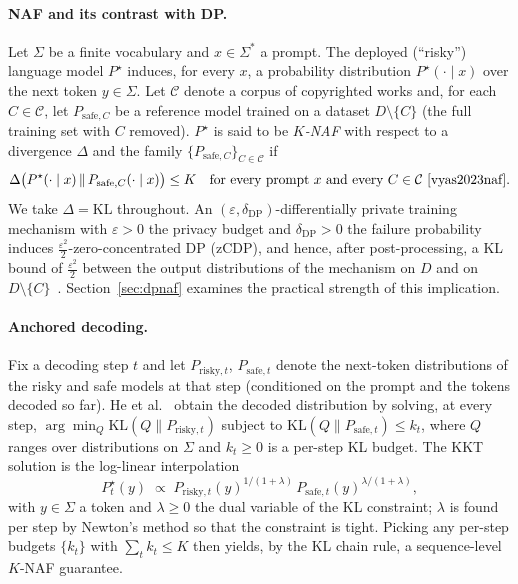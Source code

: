 \documentclass{article}
\begin{document}
\paragraph{NAF and its contrast with DP.}
Let $\Sigma$ be a finite vocabulary and $x\in\Sigma^*$ a prompt.  The deployed (``risky'') language model $P^\star$ induces, for every $x$, a probability distribution $P^\star(\cdot\mid x)$ over the next token $y\in\Sigma$.  Let $\mathcal C$ denote a corpus of copyrighted works and, for each $C\in\mathcal C$, let $P_{\mathrm{safe},C}$ be a reference model trained on a dataset $D\setminus\{C\}$ (the full training set with $C$ removed).  $P^\star$ is said to be \emph{$K$-NAF} with respect to a divergence $\Delta$ and the family $\{P_{\mathrm{safe},C}\}_{C\in\mathcal C}$ if
\[
  \Delta\bigl(P^\star(\cdot\mid x)\,\|\,P_{\mathrm{safe},C}(\cdot\mid x)\bigr)\le K\quad\text{for every prompt $x$ and every $C\in\mathcal C$}~\cite{vyas2023naf}.
\]
We take $\Delta=\mathrm{KL}$ throughout.  An $(\varepsilon,\delta_{\mathrm{DP}})$-differentially private training mechanism with $\varepsilon>0$ the privacy budget and $\delta_{\mathrm{DP}}>0$ the failure probability induces $\tfrac{\varepsilon^2}{2}$-zero-concentrated DP (zCDP), and hence, after post-processing, a KL bound of $\tfrac{\varepsilon^2}{2}$ between the output distributions of the mechanism on $D$ and on $D\setminus\{C\}$~\cite{bunsteinke2016cdp}.  Section~\ref{sec:dpnaf} examines the practical strength of this implication.

\paragraph{Anchored decoding.}
Fix a decoding step $t$ and let $P_{\mathrm{risky},t}$, $P_{\mathrm{safe},t}$ denote the next-token distributions of the risky and safe models at that step (conditioned on the prompt and the tokens decoded so far).  He et al.~\cite{he2026anchored} obtain the decoded distribution by solving, at every step, $\arg\min_Q\mathrm{KL}(Q\|P_{\mathrm{risky},t})$ subject to $\mathrm{KL}(Q\|P_{\mathrm{safe},t})\le k_t$, where $Q$ ranges over distributions on $\Sigma$ and $k_t\ge 0$ is a per-step KL budget.  The KKT solution is the log-linear interpolation
\[
  P^\star_t(y)\;\propto\;P_{\mathrm{risky},t}(y)^{1/(1+\lambda)}\,P_{\mathrm{safe},t}(y)^{\lambda/(1+\lambda)},
\]
with $y\in\Sigma$ a token and $\lambda\ge 0$ the dual variable of the KL constraint; $\lambda$ is found per step by Newton's method so that the constraint is tight.  Picking any per-step budgets $\{k_t\}$ with $\sum_t k_t\le K$ then yields, by the KL chain rule, a sequence-level $K$-NAF guarantee.
\end{document}

